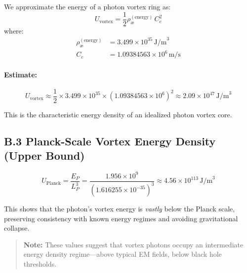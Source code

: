 We approximate the energy of a photon vortex ring as:
\[
    U_{\text{vortex}} = \frac{1}{2} \rho_\text{\ae}^{(\text{energy})} \, C_e^2
\]
where:
\begin{align*}
    \rho_\text{\ae}^{(\text{energy})} &= 3.499 \times 10^{35} \, \text{J/m}^3 \\
    C_e &= 1.09384563 \times 10^6 \, \text{m/s}
\end{align*}

\paragraph{Estimate:}
\[
    U_{\text{vortex}} \approx \frac{1}{2} \times 3.499 \times 10^{35} \times (1.09384563 \times 10^6)^2 \approx 2.09 \times 10^{47} \, \text{J/m}^3
\]

This is the characteristic energy density of an idealized photon vortex core.

\vspace{1em}

\subsection*{B.3 Planck-Scale Vortex Energy Density (Upper Bound)}

\[
    U_{\text{Planck}} = \frac{E_P}{L_P^3} = \frac{1.956 \times 10^9}{(1.616255 \times 10^{-35})^3} \approx 4.56 \times 10^{113} \, \text{J/m}^3
\]

This shows that the photon’s vortex energy is \emph{vastly} below the Planck scale, preserving consistency with known energy regimes and avoiding gravitational collapse.

\begin{quote}
    \textbf{Note:} These values suggest that vortex photons occupy an intermediate energy density regime—above typical EM fields, below black hole thresholds.
\end{quote}
